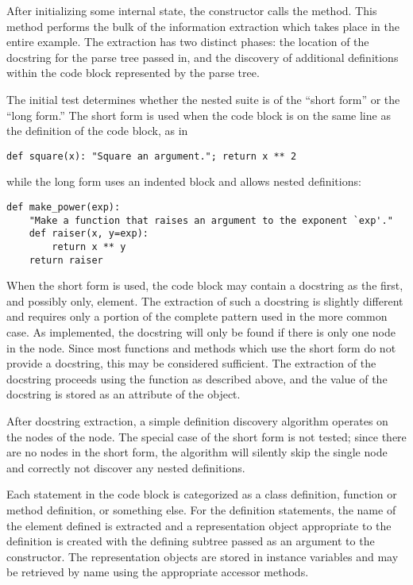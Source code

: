 After initializing some internal state, the constructor calls the
 method.  This method performs the bulk of the
information extraction which takes place in the entire example.  The
extraction has two distinct phases: the location of the docstring for
the parse tree passed in, and the discovery of additional definitions
within the code block represented by the parse tree.

The initial  test determines whether the nested suite is of
the ``short form'' or the ``long form.''  The short form is used when
the code block is on the same line as the definition of the code
block, as in

\begin{verbatim}
def square(x): "Square an argument."; return x ** 2
\end{verbatim}

while the long form uses an indented block and allows nested
definitions:

\begin{verbatim}
def make_power(exp):
    "Make a function that raises an argument to the exponent `exp'."
    def raiser(x, y=exp):
        return x ** y
    return raiser
\end{verbatim}

When the short form is used, the code block may contain a docstring as
the first, and possibly only,  element.  The
extraction of such a docstring is slightly different and requires only
a portion of the complete pattern used in the more common case.  As
implemented, the docstring will only be found if there is only
one  node in the  node.
Since most functions and methods which use the short form do not
provide a docstring, this may be considered sufficient.  The
extraction of the docstring proceeds using the  function
as described above, and the value of the docstring is stored as an
attribute of the  object.

After docstring extraction, a simple definition discovery
algorithm operates on the  nodes of the
 node.  The special case of the short form is not
tested; since there are no  nodes in the short form,
the algorithm will silently skip the single 
node and correctly not discover any nested definitions.

Each statement in the code block is categorized as
a class definition, function or method definition, or
something else.  For the definition statements, the name of the
element defined is extracted and a representation object
appropriate to the definition is created with the defining subtree
passed as an argument to the constructor.  The representation objects
are stored in instance variables and may be retrieved by name using
the appropriate accessor methods.

